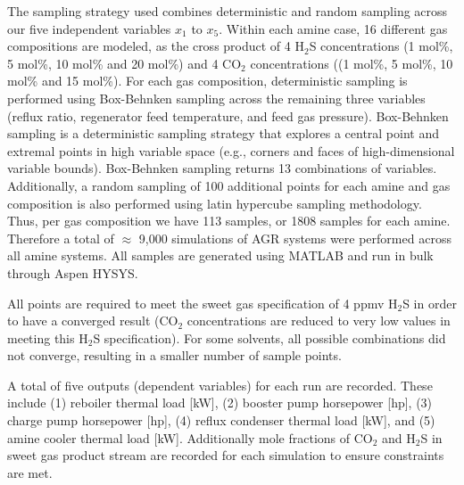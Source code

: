 \documentclass[11pt]{report}
\begin{document}
The sampling strategy used combines deterministic and random sampling across our five independent variables $x_1$ to $x_5$. Within each amine case, 16 different gas compositions are modeled, as the cross product of 4 H$_2$S concentrations (1 mol\%, 5 mol\%, 10 mol\% and 20 mol\%) and 4 CO$_2$ concentrations ((1 mol\%, 5 mol\%, 10 mol\% and 15 mol\%). For each gas composition, deterministic sampling is performed using Box-Behnken sampling across the remaining three variables (reflux ratio, regenerator feed temperature, and feed gas pressure). Box-Behnken sampling is a deterministic sampling strategy that explores a central point and extremal points in high variable space (e.g., corners and faces of high-dimensional variable bounds). Box-Behnken sampling returns 13 combinations of variables. Additionally, a random sampling of 100 additional points for each amine and gas composition is also performed using latin hypercube sampling methodology. Thus, per gas composition we have 113 samples, or 1808 samples for each amine. Therefore a total of $\approx$ 9,000 simulations of AGR systems were performed across all amine systems. All samples are generated using MATLAB \cite{Mathworks2016} and run in bulk through Aspen HYSYS.  

All points are required to meet the sweet gas specification of 4 ppmv H$_2$S in order to have a converged result (CO$_2$ concentrations are reduced to very low values in meeting this H$_2$S specification).  For some solvents, all possible combinations did not converge, resulting in a smaller number of sample points.
 
A total of five outputs (dependent variables) for each run are recorded. These include (1) reboiler thermal load [kW], (2) booster pump horsepower [hp], (3) charge pump horsepower [hp], (4) reflux condenser thermal load [kW], and (5) amine cooler thermal load [kW]. Additionally mole fractions of CO$_2$ and H$_2$S in sweet gas product stream are recorded for each simulation to ensure constraints are met.
\end{document}
